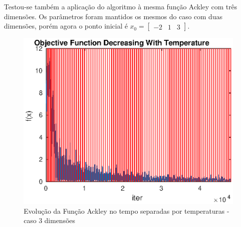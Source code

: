 \documentclass[conference,compsoc]{IEEEtran}
\begin{document}
Testou-se também a aplicação do algoritmo à mesma função Ackley com três dimensões. Os parâmetros foram mantidos os mesmos do caso com duas dimensões, porém agora o ponto inicial é $x_0= \begin{bmatrix}-2& 1& 3\end{bmatrix}$. 

\begin{figure}[!htcb]
\centering
\includegraphics[scale=0.65]{SA_ackley_T_3dim.eps}
\caption{Evolução da Função Ackley no tempo separadas por temperaturas - caso 3 dimensões}
\label{fig:SA_ackley_T_3dim}
\end{figure}
\end{document}
